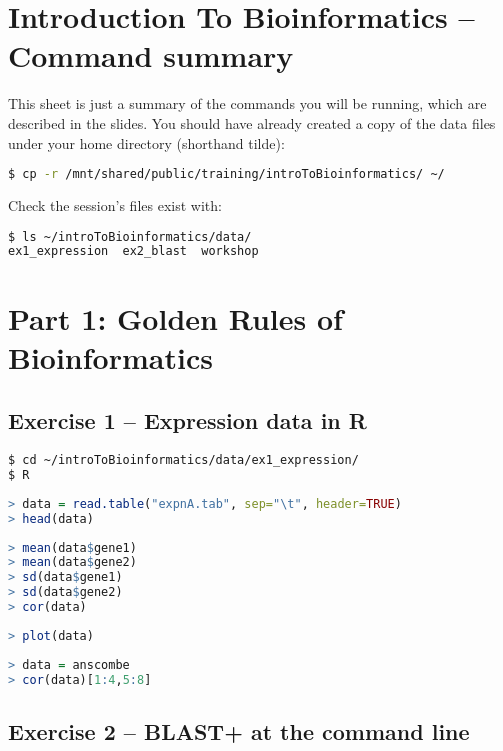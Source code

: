 \documentclass[a4paper]{article}
\begin{document}
\section*{Introduction To Bioinformatics -- Command summary}

This sheet is just a summary of the commands you will be running, which are described in the slides.
You should have already created a copy of the data files under your home directory (shorthand tilde):
\begin{lstlisting}[language=bash]
$ cp -r /mnt/shared/public/training/introToBioinformatics/ ~/
\end{lstlisting}

Check the session's files exist with:
\begin{lstlisting}[language=bash]
$ ls ~/introToBioinformatics/data/
ex1_expression  ex2_blast  workshop
\end{lstlisting}

\section*{Part 1: Golden Rules of Bioinformatics}

\subsection*{Exercise 1 -- Expression data in R}

\begin{lstlisting}[language=bash]
$ cd ~/introToBioinformatics/data/ex1_expression/
$ R
\end{lstlisting}

\begin{lstlisting}[language=R]
> data = read.table("expnA.tab", sep="\t", header=TRUE)
> head(data)
\end{lstlisting}

\begin{lstlisting}[language=R]
> mean(data$gene1)
> mean(data$gene2)
> sd(data$gene1)
> sd(data$gene2)
> cor(data)
\end{lstlisting}

\begin{lstlisting}[language=R]
> plot(data)
\end{lstlisting}

\begin{lstlisting}[language=R]
> data = anscombe
> cor(data)[1:4,5:8]
\end{lstlisting}

\subsection*{Exercise 2 -- BLAST+ at the command line}
\end{document}
